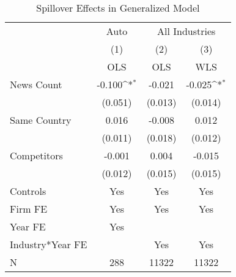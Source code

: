 \begin{table}[htbp]\centering
\def\sym#1{\ifmmode^{#1}\else\(^{#1}\)\fi}
\caption{Spillover Effects in Generalized Model}
\begin{tabular}{l*{3}{c}}
\toprule
                    &\multicolumn{1}{c}{Auto}&\multicolumn{2}{c}{All Industries}         \\\cmidrule(lr){2-2}\cmidrule(lr){3-4}
                    &\multicolumn{1}{c}{(1)}&\multicolumn{1}{c}{(2)}&\multicolumn{1}{c}{(3)}\\
                    &\multicolumn{1}{c}{OLS}&\multicolumn{1}{c}{OLS}&\multicolumn{1}{c}{WLS}\\
\midrule
News Count          &      -0.100\sym{*}  &      -0.021         &      -0.025\sym{*}  \\
                    &     (0.051)         &     (0.013)         &     (0.014)         \\
\addlinespace
Same Country        &       0.016         &      -0.008         &       0.012         \\
                    &     (0.011)         &     (0.018)         &     (0.012)         \\
\addlinespace
Competitors         &      -0.001         &       0.004         &      -0.015         \\
                    &     (0.012)         &     (0.015)         &     (0.015)         \\
\midrule
Controls            &         Yes         &         Yes         &         Yes         \\
Firm FE             &         Yes         &         Yes         &         Yes         \\
Year FE             &         Yes         &                     &                     \\
Industry*Year FE    &                     &         Yes         &         Yes         \\
N                   &         288         &       11322         &       11322         \\
\bottomrule
\end{tabular}
\end{table}

